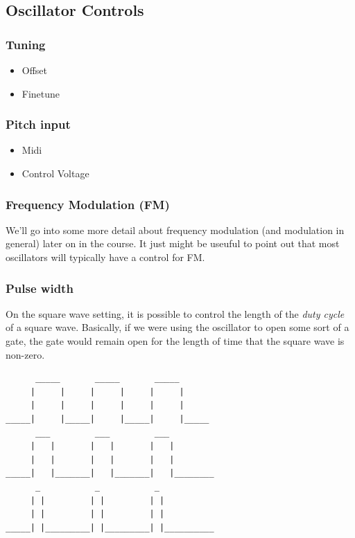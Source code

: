 \documentclass[11pt]{article}
\begin{document}
\subsection{Oscillator Controls}
\label{sec:org42d239b}
\subsubsection{Tuning}
\label{sec:orgf19c0a3}
\begin{itemize}
\item Offset
\item Finetune
\end{itemize}

\subsubsection{Pitch input}
\label{sec:org75ba9cb}
\begin{itemize}
\item Midi
\item Control Voltage
\end{itemize}

\subsubsection{Frequency Modulation (FM)}
\label{sec:orgc265b2a}
We'll go into some more detail about frequency modulation (and
modulation in general) later on in the course. It just might be
useuful to point out that most oscillators will typically have a
control for FM.

\subsubsection{Pulse width}
\label{sec:org7104888}
On the square wave setting, it is possible to control the length of
the \emph{duty cycle} of a square wave. Basically, if we were using the
oscillator to open some sort of a gate, the gate would remain open for
the length of time that the square wave is non-zero. 

\begin{verbatim}
      _____       _____       _____
     |     |     |     |     |     |
     |     |     |     |     |     |
_____|     |_____|     |_____|     |_____
      ___         ___         ___
     |   |       |   |       |   |
     |   |       |   |       |   |
_____|   |_______|   |_______|   |________
      _           _           _
     | |         | |         | |
     | |         | |         | |
_____| |_________| |_________| |__________

\end{verbatim}
\end{document}
